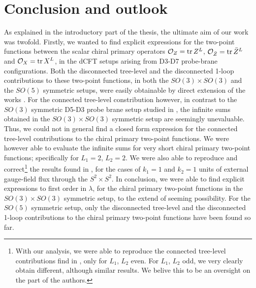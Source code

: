 %
\section{Conclusion and outlook}
As explained in the introductory part of the thesis, the ultimate aim of our work was twofold. Firstly, we wanted to find explicit expressions for the two-point functions between the scalar chiral primary operators $\mathcal{O}_{Z} = \tr Z^L$, $\mathcal{O}_{\bar{Z}} = \tr \bar{Z}^L$ and $\mathcal{O}_{X} = \tr X^L$, in the dCFT setups arising from D3-D7 probe-brane configurations. Both the disconnected tree-level and the disconnected 1-loop contributions to these two-point functions, in both the $SO(3) \times SO(3)$ and the $SO(5)$ symmetric setups, were easily obtainable by direct extension of the works \cite{One-point functions in D3-D7, One-point functions in D3-D7 SO(5)}. For the connected tree-level constribution however, in contrast to the $SO(3)$ symmetric D5-D3 probe brane setup studied in \cite{Two-point functions in D5-D3}, the infinite sums obtained in the $SO(3) \times SO(3)$ symmetric setup are seemingly unevaluable. Thus, we could not in general find a closed form expression for the connected tree-level contributions to the chiral primary two-point functions. We were however able to evaluate the infinite sums for very short chiral primary two-point functions; specifically for $L_1  = 2$, $L_2 = 2$. We were also able to reproduce and correct\footnote{With our analysis, we were able to reproduce the connected tree-level contributions find in \cite{Two-point functions in D5-D3}, only for $L_1$, $L_2$ even. For $L_1$, $L_2$ odd, we very clearly obtain different, although similar results. We belive this to be an oversight on the part of the authors.} the results found in \cite{Two-point functions in D5-D3}, for the cases of $k_1 = 1$ and $k_2 = 1$ units of external gauge-field flux through the $S^2 \times S^2$. In conclusion, we were able to find explicit expressions to first order in $\lambda$, for the chiral primary two-point functions in the $SO(3) \times SO(3)$ symmetric setup, to the extend of seeming possibility. For the $SO(5)$ symmetric setup, only the disconnected tree-level and the disconnected 1-loop contributions to the chiral primary two-point functions have been found so far.\\
